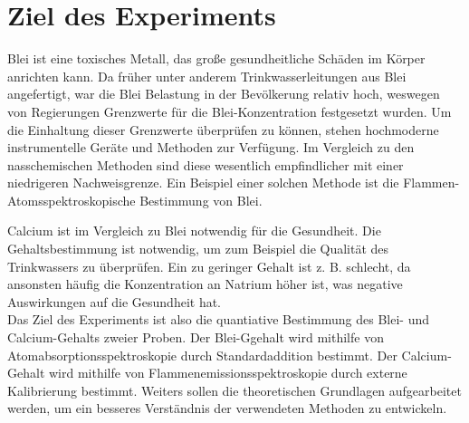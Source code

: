 \section{Ziel des Experiments}

  Blei ist eine toxisches Metall, das große gesundheitliche Schäden im Körper anrichten kann. Da früher unter anderem Trinkwasserleitungen aus Blei angefertigt, war die Blei Belastung in der Bevölkerung relativ hoch, weswegen von Regierungen Grenzwerte für die Blei-Konzentration festgesetzt wurden.\citep{UmweltbundesamtBlei} Um die Einhaltung dieser Grenzwerte überprüfen zu können, stehen hochmoderne instrumentelle Geräte und Methoden zur Verfügung. Im Vergleich zu den nasschemischen Methoden sind diese wesentlich empfindlicher mit einer niedrigeren Nachweisgrenze. Ein Beispiel einer solchen Methode ist die Flammen-Atomsspektroskopische Bestimmung von Blei. \citep{Mikromethode} 
  
  Calcium ist im Vergleich zu Blei notwendig für die Gesundheit. Die Gehaltsbestimmung ist notwendig, um zum Beispiel die Qualität des Trinkwassers zu überprüfen. Ein zu geringer Gehalt ist z. B. schlecht, da ansonsten häufig die Konzentration an Natrium höher ist, was negative Auswirkungen auf die Gesundheit hat.\citep{CalciumGrenzwert} \\
  
  Das Ziel des Experiments ist also die quantiative Bestimmung des Blei- und Calcium-Gehalts zweier Proben. Der Blei-Ggehalt wird mithilfe von Atomabsorptionsspektroskopie durch Standardaddition bestimmt. Der Calcium-Gehalt wird mithilfe von Flammenemissionsspektroskopie durch externe Kalibrierung bestimmt. Weiters sollen die theoretischen Grundlagen aufgearbeitet werden, um ein besseres Verständnis der verwendeten Methoden zu entwickeln. 
